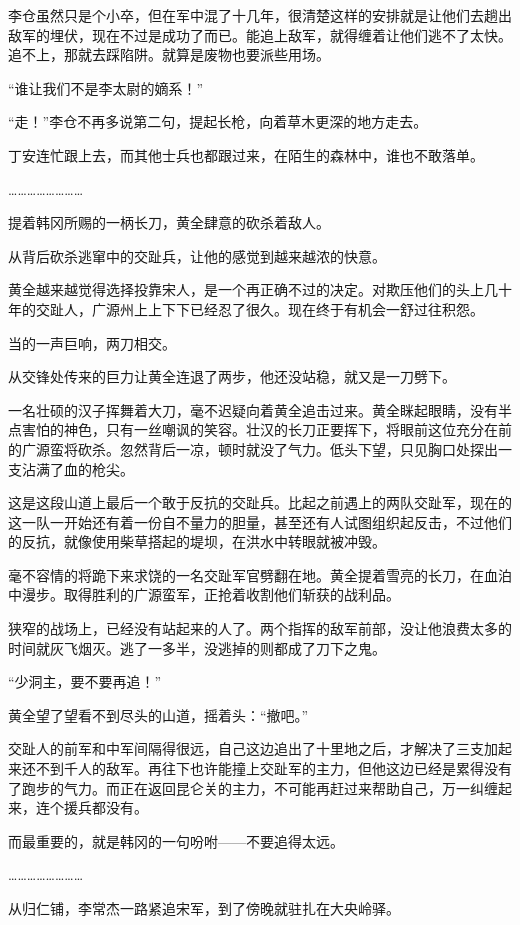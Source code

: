李仓虽然只是个小卒，但在军中混了十几年，很清楚这样的安排就是让他们去趟出敌军的埋伏，现在不过是成功了而已。能追上敌军，就得缠着让他们逃不了太快。追不上，那就去踩陷阱。就算是废物也要派些用场。

“谁让我们不是李太尉的嫡系！”

“走！”李仓不再多说第二句，提起长枪，向着草木更深的地方走去。

丁安连忙跟上去，而其他士兵也都跟过来，在陌生的森林中，谁也不敢落单。

……………………

提着韩冈所赐的一柄长刀，黄全肆意的砍杀着敌人。

从背后砍杀逃窜中的交趾兵，让他的感觉到越来越浓的快意。

黄全越来越觉得选择投靠宋人，是一个再正确不过的决定。对欺压他们的头上几十年的交趾人，广源州上上下下已经忍了很久。现在终于有机会一舒过往积怨。

当的一声巨响，两刀相交。

从交锋处传来的巨力让黄全连退了两步，他还没站稳，就又是一刀劈下。

一名壮硕的汉子挥舞着大刀，毫不迟疑向着黄全追击过来。黄全眯起眼睛，没有半点害怕的神色，只有一丝嘲讽的笑容。壮汉的长刀正要挥下，将眼前这位充分在前的广源蛮将砍杀。忽然背后一凉，顿时就没了气力。低头下望，只见胸口处探出一支沾满了血的枪尖。

这是这段山道上最后一个敢于反抗的交趾兵。比起之前遇上的两队交趾军，现在的这一队一开始还有着一份自不量力的胆量，甚至还有人试图组织起反击，不过他们的反抗，就像使用柴草搭起的堤坝，在洪水中转眼就被冲毁。

毫不容情的将跪下来求饶的一名交趾军官劈翻在地。黄全提着雪亮的长刀，在血泊中漫步。取得胜利的广源蛮军，正抢着收割他们斩获的战利品。

狭窄的战场上，已经没有站起来的人了。两个指挥的敌军前部，没让他浪费太多的时间就灰飞烟灭。逃了一多半，没逃掉的则都成了刀下之鬼。

“少洞主，要不要再追！”

黄全望了望看不到尽头的山道，摇着头：“撤吧。”

交趾人的前军和中军间隔得很远，自己这边追出了十里地之后，才解决了三支加起来还不到千人的敌军。再往下也许能撞上交趾军的主力，但他这边已经是累得没有了跑步的气力。而正在返回昆仑关的主力，不可能再赶过来帮助自己，万一纠缠起来，连个援兵都没有。

而最重要的，就是韩冈的一句吩咐——不要追得太远。

……………………

从归仁铺，李常杰一路紧追宋军，到了傍晚就驻扎在大央岭驿。

